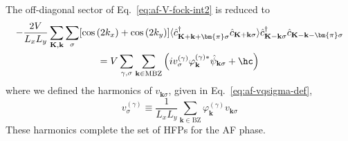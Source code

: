 The off-diagonal sector of Eq.~\eqref{eq:af-V-fock-int2} is reduced to
\begin{multline}
	-\frac{2V}{L_x L_y} \sum_{\mathbf{K}, \mathbf{k}} \sum_\sigma [
	\cos \left(
	2k_x
	\right)	+ \cos \left(
	2k_y
	\right)	
	] \langle
	\hat c_{\mathbf{K}+\mathbf{k}+\bm{\pi} \sigma}^\dagger 
	\hat c_{\mathbf{K}+\mathbf{k} \sigma}
	\rangle
	\hat c_{\mathbf{K}-\mathbf{k} \sigma}^\dagger \hat c_{\mathbf{K}-\mathbf{k}-\bm{\pi} \sigma} \\
	= V\sum_{\gamma,\sigma}
	\sum_{\mathbf{k}\in\mathrm{MBZ}}
	\left(
	iv^{(\gamma)}_\sigma \varphi_\mathbf{k}^{(\gamma)*}
	\hat \psi_{\mathbf{k}\sigma} + \hc
	\right)
	\label{eq:af-V-fock-int4-offdiag}
\end{multline}
where we defined the harmonics of $v_{\mathbf{k}\sigma}$, given in Eq.~\eqref{eq:af-vqsigma-def},
\begin{equation}\label{eq:af-vgamma-harmonics}
	v^{(\gamma)}_\sigma \equiv \frac{1}{L_x L_y} \sum_{\mathbf{k}\in\mathrm{BZ}} \varphi_\mathbf{k}^{(\gamma)} v_{\mathbf{k}\sigma}
\end{equation}
These harmonics complete the set of HFPs for the AF phase.

